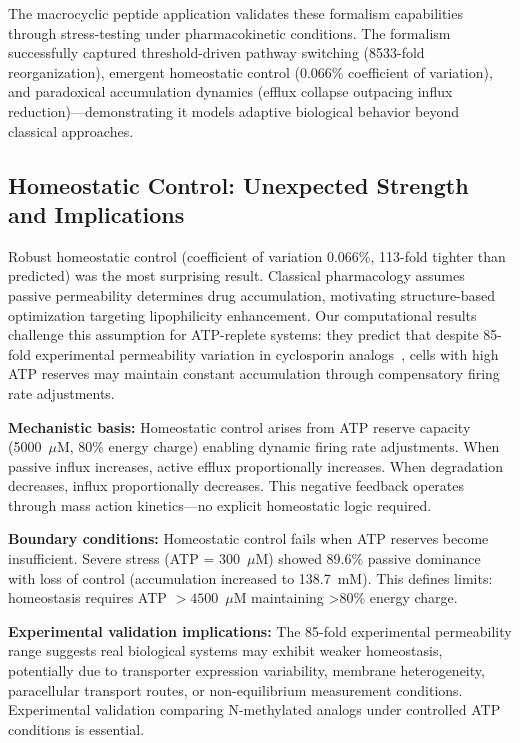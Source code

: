 \documentclass[10pt,letterpaper]{article}
\begin{document}
The macrocyclic peptide application validates these formalism capabilities through stress-testing under pharmacokinetic conditions. The formalism successfully captured threshold-driven pathway switching (8533-fold reorganization), emergent homeostatic control (0.066\% coefficient of variation), and paradoxical accumulation dynamics (efflux collapse outpacing influx reduction)---demonstrating it models adaptive biological behavior beyond classical approaches.

\subsection{Homeostatic Control: Unexpected Strength and Implications}

Robust homeostatic control (coefficient of variation 0.066\%, 113-fold tighter than predicted) was the most surprising result. Classical pharmacology assumes passive permeability determines drug accumulation, motivating structure-based optimization targeting lipophilicity enhancement. Our computational results challenge this assumption for ATP-replete systems: they predict that despite 85-fold experimental permeability variation in cyclosporin analogs~\cite{Doak2014}, cells with high ATP reserves may maintain constant accumulation through compensatory firing rate adjustments.

\textbf{Mechanistic basis:} Homeostatic control arises from ATP reserve capacity (5000~$\mu$M, 80\% energy charge) enabling dynamic firing rate adjustments. When passive influx increases, active efflux proportionally increases. When degradation decreases, influx proportionally decreases. This negative feedback operates through mass action kinetics---no explicit homeostatic logic required.

\textbf{Boundary conditions:} Homeostatic control fails when ATP reserves become insufficient. Severe stress (ATP = 300~$\mu$M) showed 89.6\% passive dominance with loss of control (accumulation increased to 138.7~mM). This defines limits: homeostasis requires ATP $> 4500$~$\mu$M maintaining >80\% energy charge.

\textbf{Experimental validation implications:} The 85-fold experimental permeability range suggests real biological systems may exhibit weaker homeostasis, potentially due to transporter expression variability, membrane heterogeneity, paracellular transport routes, or non-equilibrium measurement conditions. Experimental validation comparing N-methylated analogs under controlled ATP conditions is essential.
\end{document}

